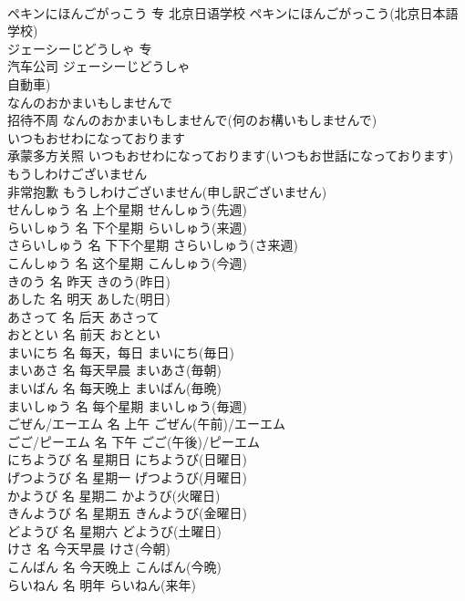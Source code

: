 \documentclass[8pt]{extreport}
\begin{document}
\begin{CJK}{UTF8}{min}
\\	ペキンにほんごがっこう	专	北京日语学校	ペキンにほんごがっこう(北京日本語学校)	
\\	ジェーシーじどうしゃ	专	
\\	汽车公司	ジェーシーじどうしゃ
\\	自動車)	
\\	なんのおかまいもしませんで	
\\	招待不周	なんのおかまいもしませんで(何のお構いもしませんで)	
\\	いつもおせわになっております	
\\	承蒙多方关照	いつもおせわになっております(いつもお世話になっております)	
\\	もうしわけございません	
\\	非常抱歉	もうしわけございません(申し訳ございません)	
\\	せんしゅう	名	上个星期	せんしゅう(先週)	
\\	らいしゅう	名	下个星期	らいしゅう(来週)	
\\	さらいしゅう	名	下下个星期	さらいしゅう(さ来週)	
\\	こんしゅう	名	这个星期	こんしゅう(今週)	
\\	きのう	名	昨天	きのう(昨日)	
\\	あした	名	明天	あした(明日)	
\\	あさって	名	后天	あさって	
\\	おととい	名	前天	おととい	
\\	まいにち	名	每天，每日	まいにち(毎日)	
\\	まいあさ	名	每天早晨	まいあさ(毎朝)	
\\	まいばん	名	每天晚上	まいばん(毎晩)	
\\	まいしゅう	名	每个星期	まいしゅう(毎週)	
\\	ごぜん/エーエム	名	上午	ごぜん(午前)/エーエム
\\	ごご/ピーエム	名	下午	ごご(午後)/ピーエム
\\	にちようび	名	星期日	にちようび(日曜日)	
\\	げつようび	名	星期一	げつようび(月曜日)	
\\	かようび	名	星期二	かようび(火曜日)	
\\	きんようび	名	星期五	きんようび(金曜日)	
\\	どようび	名	星期六	どようび(土曜日)	
\\	けさ	名	今天早晨	けさ(今朝)	
\\	こんばん	名	今天晚上	こんばん(今晩)	
\\	らいねん	名	明年	らいねん(来年)	

\end{CJK}
\end{document}
